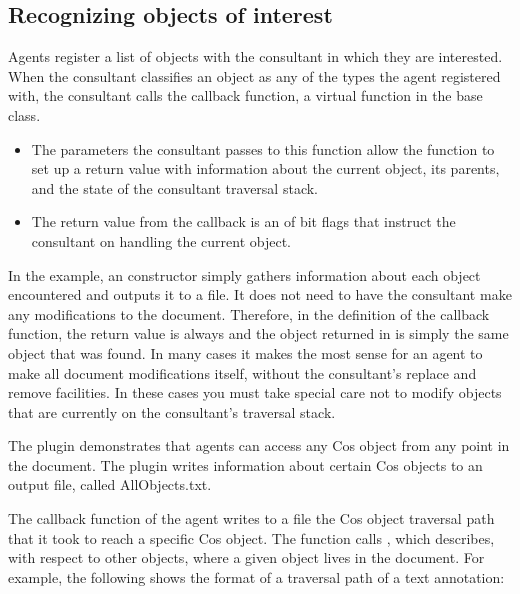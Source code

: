 \documentclass[letterpaper,12pt,english,openany,oneside]{sphinxmanual}
\begin{document}
\subsection{Recognizing objects of interest}
\label{\detokenize{Plugins_ExtendedAPI:recognizing-objects-of-interest}}
Agents register a list of objects with the consultant in which they are interested. When the consultant classifies an object as any of the types the agent registered with, the consultant calls the  callback function, a virtual function in the  base class.
\begin{itemize}
\item {} 
The parameters the consultant passes to this function allow the function to set up a return value with information about the current object, its parents, and the state of the consultant traversal stack.

\item {} 
The return value from the callback is an  of bit flags that instruct the consultant on handling the current object.

\end{itemize}

In the  example, an  constructor simply gathers information about each object encountered and outputs it to a file. It does not need to have the consultant make any modifications to the document. Therefore, in the definition of the  callback function, the return value is always  and the object returned in  is simply the same object that was found. In many cases it makes the most sense for an agent to make all document modifications itself, without the consultant’s replace and remove facilities. In these cases you must take special care not to modify objects that are currently on the consultant’s traversal stack.

The  plugin demonstrates that  agents can access any Cos object from any point in the document. The plugin writes information about certain Cos objects to an output file, called AllObjects.txt.

The  callback function of the  agent writes to a file the Cos object traversal path that it took to reach a specific Cos object. The function calls , which describes, with respect to other objects, where a given object lives in the document. For example, the following shows the format of a traversal path of a text annotation:
\end{document}
